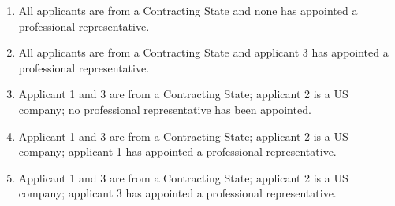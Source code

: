 \documentclass{report}
\begin{document}
\begin{enumerate}[label=\textbf{Answer \arabic*}]
\begin{enumerate}[label=\textbf{Answer \arabic*}]
    \begin{enumerate}[label=(\alph*)]
        \item All applicants are from a Contracting State and none has appointed a professional representative.
        \item All applicants are from a Contracting State and applicant 3 has appointed a professional representative.
        \item Applicant 1 and 3 are from a Contracting State; applicant 2 is a US company; no professional representative has been appointed.
        \item Applicant 1 and 3 are from a Contracting State; applicant 2 is a US company; applicant 1 has appointed a professional representative.
        \item Applicant 1 and 3 are from a Contracting State; applicant 2 is a US company; applicant 3 has appointed a professional representative.
    \end{enumerate}

\end{enumerate}
\end{enumerate}
\end{document}
